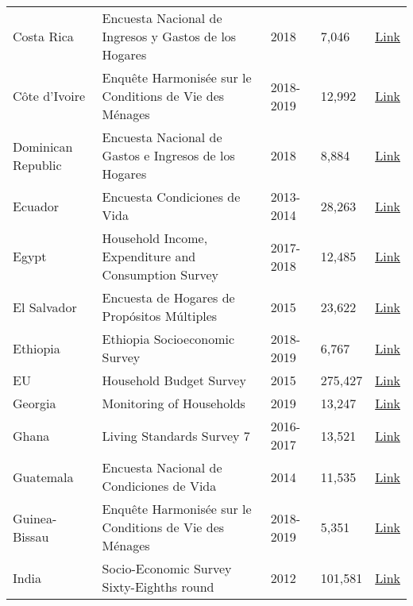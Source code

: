 \begin{ThreePartTable}
\begin{longtable}[t]{l|p{8cm}|l|l|l}
        Costa Rica & Encuesta Nacional de Ingresos y Gastos de los Hogares & 2018 &  7,046  & \href{https://inec.cr/estadisticas-fuentes/encuestas/encuesta-nacional-ingresos-gastos-los-hogares}{Link} \\ 
        Côte d'Ivoire & Enquête Harmonisée sur le Conditions de Vie des Ménages & 2018-2019 &  12,992  & \href{https://microdata.worldbank.org/index.php/catalog/4292/study-description}{Link} \\ 
        Dominican Republic & Encuesta Nacional de Gastos e Ingresos de los Hogares & 2018 &  8,884  & \href{https://archivo.one.gob.do/encuestas/enigh}{Link} \\ 
        Ecuador & Encuesta Condiciones de Vida & 2013-2014 &  28,263  & \href{https://aplicaciones3.ecuadorencifras.gob.ec/BIINEC-war/index.xhtml}{Link} \\ 
        Egypt & Household Income, Expenditure and Consumption Survey & 2017-2018 &  12,485  & \href{http://www.erfdataportal.com/index.php/catalog/129}{Link} \\ 
        El Salvador & Encuesta de Hogares de Propósitos Múltiples & 2015 &  23,622  & \href{http://www.digestyc.gob.sv/index.php/temas/des/ehpm.html}{Link} \\ 
        Ethiopia & Ethiopia Socioeconomic Survey & 2018-2019 &  6,767  & \href{https://microdata.worldbank.org/index.php/catalog/3823}{Link} \\ 
        EU & Household Budget Survey & 2015 &  275,427  & \href{https://ec.europa.eu/eurostat/web/microdata/household-budget-survey}{Link} \\ 
        Georgia & Monitoring of Households & 2019 &  13,247  & \href{https://www.geostat.ge/en/modules/categories/128/databases-of-2009-2016-integrated-household-survey-and-2017-households-income-and-expenditure-survey}{Link} \\ 
        Ghana & Living Standards Survey 7 & 2016-2017 &  13,521  & \href{https://www2.statsghana.gov.gh/nada/index.php/catalog/97/study-description}{Link} \\ 
        Guatemala & Encuesta Nacional de Condiciones de Vida & 2014 &  11,535  & \href{https://www.proyectoencovi.com/}{Link} \\ 
        Guinea-Bissau & Enquête Harmonisée sur le Conditions de Vie des Ménages & 2018-2019 &  5,351  & \href{https://microdata.worldbank.org/index.php/catalog/4293}{Link} \\ 
        India & Socio-Economic Survey Sixty-Eighths round & 2012 &  101,581  & \href{https://catalog.ihsn.org/index.php/catalog/3281}{Link} \\ 

\end{longtable}
\end{ThreePartTable}
